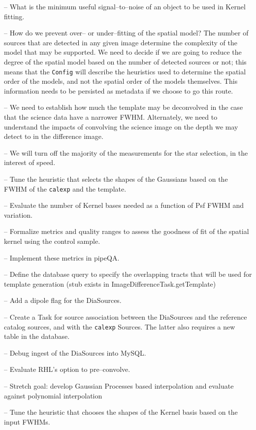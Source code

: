 \documentclass[prd, nofootinbib, floatfix, 11pt,tightenlines,times]{article}
\begin{document}
-- What is the minimum useful signal--to--noise of an object to be
used in Kernel fitting.

-- How do we prevent over-- or under--fitting of the spatial model?
The number of sources that are detected in any given image determine
the complexity of the model that may be supported.  We need to decide
if we are going to reduce the degree of the spatial model based on the
number of detected sources or not; this means that the {\tt Config}
will describe the heuristics used to determine the spatial order of
the models, and not the spatial order of the models themselves.  This
information needs to be persisted as metadata if we choose to go this
route.

-- We need to establish how much the template may be deconvolved in
the case that the science data have a narrower FWHM.  Alternately, we
need to understand the impacts of convolving the science image on the
depth we may detect to in the difference image.

-- We will turn off the majority of the measurements for the star
selection, in the interest of speed.

-- Tune the heuristic that selects the shapes of the Gaussians based
on the FWHM of the {\tt calexp} and the template.

-- Evaluate the number of Kernel bases needed as a function of Psf
FWHM and variation.

-- Formalize metrics and quality ranges to assess the goodness of fit
of the spatial kernel using the control sample.

-- Implement these metrics in pipeQA.

-- Define the database query to specify the overlapping tracts that
will be used for template generation (stub exists in
ImageDifferenceTask.getTemplate)

-- Add a dipole flag for the DiaSources.

-- Create a Task for source association between the DiaSources and the
reference catalog sources, and with the {\tt calexp} Sources.  The
latter also requires a new table in the database.

-- Debug ingest of the DiaSources into MySQL.

-- Evaluate RHL's option to pre--convolve.

-- Stretch goal: develop Gaussian Processes based interpolation and
evaluate against polynomial interpolation

-- Tune the heuristic that chooses the shapes of the Kernel basis
based on the input FWHMs.
\end{document}
